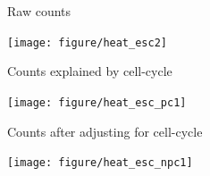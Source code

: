 \documentclass{beamer}\usepackage[]{graphicx}\usepackage[]{color}
\newenvironment{knitrout}{}{} %
\begin{document}
\begin{frame}[fragile]{Raw counts}
\begin{knitrout}\tiny
{}\color{fgcolor}

{\centering \texttt{[image: figure/heat\_esc2]} 

}



\end{knitrout}
\end{frame}

\begin{frame}[fragile]{Counts explained by cell-cycle}
\begin{knitrout}\tiny
{}\color{fgcolor}

{\centering \texttt{[image: figure/heat\_esc\_pc1]} 

}



\end{knitrout}
\end{frame}

\begin{frame}[fragile]{Counts after adjusting for cell-cycle}
\begin{knitrout}\tiny
{}\color{fgcolor}

{\centering \texttt{[image: figure/heat\_esc\_npc1]} 

}



\end{knitrout}
\end{frame}


\end{document}
